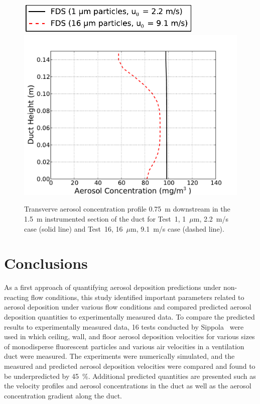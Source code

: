 \begin{figure}[!ht]
\centering
\includegraphics[width=3.5in]{Fig_Sippola_Aerosol_Deposition_Transverse_Legend.pdf}
\includegraphics[width=5.0in]{Fig_Sippola_Aerosol_Deposition_Transverse_Concentration.pdf}
\caption[Transverse aerosol concentration profile, Sippola Aerosol Deposition]
{Transverve aerosol concentration profile 0.75~m downstream in the 1.5~m instrumented section of the duct for Test~1, 1~$\mu$m, 2.2~m/s case (solid line) and Test~16, 16~$\mu$m, 9.1~m/s case (dashed line).}
\label{fig:Sippola_Transverse_Concentration}
\end{figure}

\section{Conclusions}
\label{sec:Conclusions}

As a first approach of quantifying aerosol deposition predictions under non-reacting flow conditions, this study identified important parameters related to aerosol deposition under various flow conditions and compared predicted aerosol deposition quantities to experimentally measured data. To compare the predicted results to experimentally measured data, 16 tests conducted by Sippola~\cite{Sippola:1} were used in which ceiling, wall, and floor aerosol deposition velocities for various sizes of monodisperse fluorescent particles and various air velocities in a ventilation duct were measured. The experiments were numerically simulated, and the measured and predicted aerosol deposition velocities were compared and found to be underpredicted by 45~\%. Additional predicted quantities are presented such as the velocity profiles and aerosol concentrations in the duct as well as the aerosol concentration gradient along the duct.

